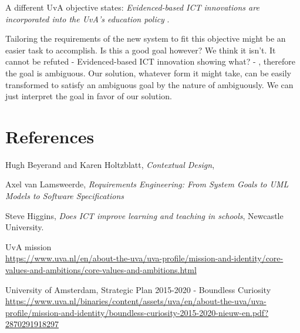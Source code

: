 A different UvA objective states: \emph{Evidenced-based ICT innovations are	incorporated into the UvA’s education policy} \cite{uva_strategic_plan}.

Tailoring the requirements of the new system to fit this objective might be an easier task to accomplish. Is this a good goal however? We think it isn't. It cannot be refuted - Evidenced-based ICT innovation showing what? - , therefore the goal is ambiguous. Our solution, whatever form it might take, can be easily transformed to satisfy an ambiguous goal by the nature of ambiguously. We can just interpret the goal in favor of our solution. 


\chapter{References}

\begin{thebibliography}{9}
	
	Hugh Beyerand and Karen Holtzblatt,
	\emph{Contextual Design},
	
	Axel van Lamsweerde,
	\emph{Requirements Engineering: From System Goals to UML Models to Software Specifications}
	
	Steve Higgins,
	\emph{Does ICT improve learning and teaching in schools},
	Newcastle University.
	
	UvA mission \\
	\url{https://www.uva.nl/en/about-the-uva/uva-profile/mission-and-identity/core-values-and-ambitions/core-values-and-ambitions.html}
	
	University of Amsterdam,
	Strategic Plan 2015-2020 - Boundless Curiosity \\
	\url{https://www.uva.nl/binaries/content/assets/uva/en/about-the-uva/uva-profile/mission-and-identity/boundless-curiosity-2015-2020-nieuw-en.pdf?2870291918297}
	
	

	
\end{thebibliography}


\appendix



